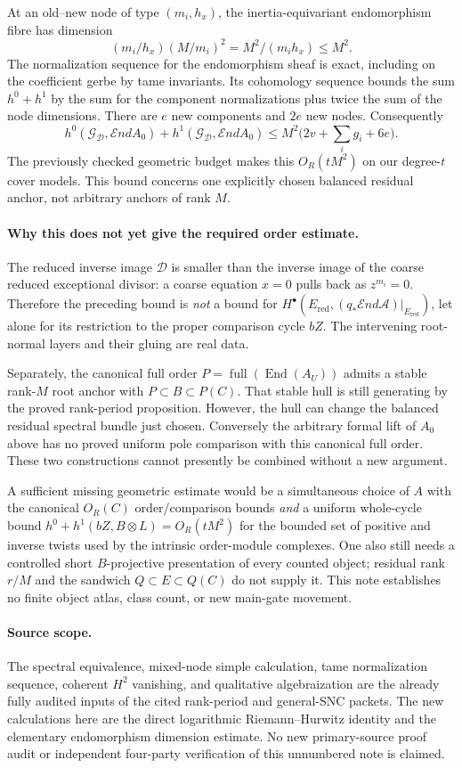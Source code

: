 At an old--new node of type $(m_i,h_x)$, the inertia-equivariant
endomorphism fibre has dimension
\[
       (m_i/h_x)(M/m_i)^2=M^2/(m_i h_x)\le M^2.
\]
The normalization sequence for the endomorphism sheaf is exact,
including on the coefficient gerbe by tame invariants. Its cohomology
sequence bounds the sum $h^0+h^1$ by the sum for the component
normalizations plus twice the sum of the node dimensions. There are
$e$ new components and $2e$ new nodes. Consequently
\[
 h^0(\mathcal G_{\mathcal D},\mathcal End A_0)
 +h^1(\mathcal G_{\mathcal D},\mathcal End A_0)
     \le M^2\bigl(2v+\sum_i g_i+6e\bigr).
\]
The previously checked geometric budget makes this $O_R(tM^2)$ on
our degree-$t$ cover models. This bound concerns one explicitly
chosen balanced residual anchor, not arbitrary anchors of rank $M$.

\paragraph{Why this does not yet give the required order estimate.}
The reduced inverse image $\mathcal D$ is smaller than the inverse
image of the coarse reduced exceptional divisor: a coarse equation
$x=0$ pulls back as $z^{m_i}=0$. Therefore the preceding bound is
\emph{not} a bound for
$H^\bullet(E_{\mathrm{red}},(q_*\mathcal End\mathcal A)|_{E_{\mathrm{red}}})$,
let alone for its restriction to the proper comparison cycle $bZ$.
The intervening root-normal layers and their gluing are real data.

Separately, the canonical full order
$P=\operatorname{full}(\operatorname{End}(A_U))$ admits a stable
rank-$M$ root anchor with
$P\subset B\subset P(C)$. That stable hull is still generating by
the proved rank-period proposition. However, the hull can change the
balanced residual spectral bundle just chosen. Conversely the
arbitrary formal lift of $A_0$ above has no proved uniform pole
comparison with this canonical full order. These two constructions
cannot presently be combined without a new argument.

A sufficient missing geometric estimate would be a simultaneous
choice of $A$ with the canonical $O_R(C)$ order/comparison bounds
\emph{and} a uniform whole-cycle bound
$h^0+h^1(bZ,B\otimes L)=O_R(tM^2)$ for the bounded set of positive
and inverse twists used by the intrinsic order-module complexes.
One also still needs a controlled short $B$-projective presentation
of every counted object; residual rank $r/M$ and the sandwich
$Q\subset E\subset Q(C)$ do not supply it. This note establishes no
finite object atlas, class count, or new main-gate movement.

\paragraph{Source scope.}
The spectral equivalence, mixed-node simple calculation, tame
normalization sequence, coherent $H^2$ vanishing, and qualitative
algebraization are the already fully audited inputs of the cited
rank-period and general-SNC packets. The new calculations here are
the direct logarithmic Riemann--Hurwitz identity and the elementary
endomorphism dimension estimate. No new primary-source proof audit
or independent four-party verification of this unnumbered note is
claimed.
